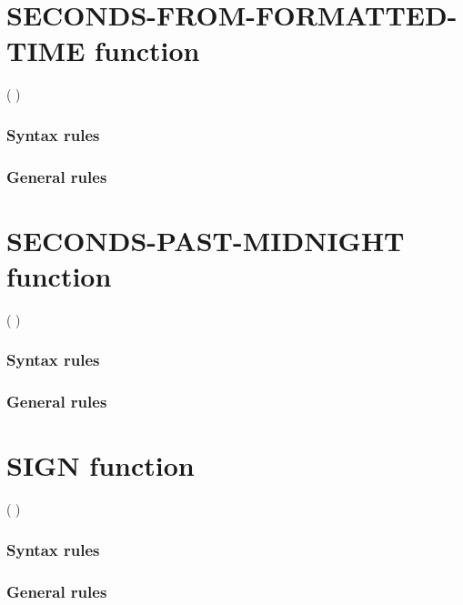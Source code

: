 \section{SECONDS-FROM-FORMATTED-TIME function}

\begin{syntax}
    ( \argument \argument )
\end{syntax}

\subsubsection{Syntax rules}

\subsubsection{General rules}

\section{SECONDS-PAST-MIDNIGHT function}

\begin{syntax}
    ( \argument )
\end{syntax}

\subsubsection{Syntax rules}

\subsubsection{General rules}

\section{SIGN function}

\begin{syntax}
    ( \argument )
\end{syntax}

\subsubsection{Syntax rules}

\subsubsection{General rules}

